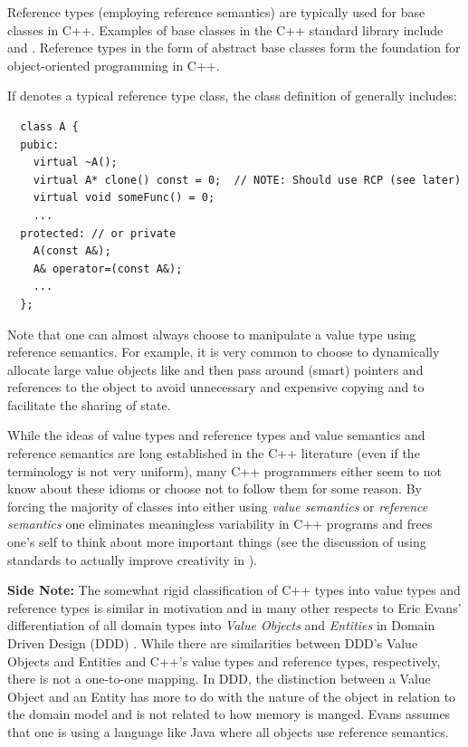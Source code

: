 \documentclass[pdf,ps2pdf,11pt]{SANDreport}
\begin{document}
Reference types (employing reference semantics) are typically used for
base classes in C++.  Examples of base classes in the C++ standard
library include {} and
{}.  Reference types in the form of
abstract base classes form the foundation for object-oriented
programming in C++.

If {} denotes a typical reference type class, the class
definition of {} generally includes:

{\small\begin{verbatim}
  class A {
  pubic:
    virtual ~A();
    virtual A* clone() const = 0;  // NOTE: Should use RCP (see later)
    virtual void someFunc() = 0;
    ...
  protected: // or private
    A(const A&);
    A& operator=(const A&);
    ...
  };
\end{verbatim}}

Note that one can almost always choose to manipulate a value type 
using reference semantics.  For example, it is very common to choose
to dynamically allocate large value objects like {}
and then pass around (smart) pointers and references to the object to
avoid unnecessary and expensive copying and to facilitate the sharing
of state.

While the ideas of value types and reference types and value semantics
and reference semantics are long established in the C++ literature
(even if the terminology is not very uniform), many C++ programmers
either seem to not know about these idioms or choose not to follow
them for some reason.  By forcing the majority of classes into either
using {}\textit{value semantics} or {}\textit{reference semantics} one
eliminates meaningless variability in C++ programs and frees one's
self to think about more important things (see the discussion of using
standards to actually improve creativity in
{}\cite{CodeComplete2nd04}).

{}\textbf{Side Note:} The somewhat rigid classification of C++ types
into value types and reference types is similar in motivation and in
many other respects to Eric Evans' differentiation of all domain types
into {}\textit{Value Objects} and {}\textit{Entities} in Domain Driven
Design (DDD) {}\cite{DomainDrivenDesign}.  While there are
similarities between DDD's Value Objects and Entities and C++'s value
types and reference types, respectively, there is not a one-to-one
mapping.  In DDD, the distinction between a Value Object and an Entity
has more to do with the nature of the object in relation to the domain
model and is not related to how memory is manged.  Evans assumes that
one is using a language like Java where all objects use reference
semantics.
\end{document}
